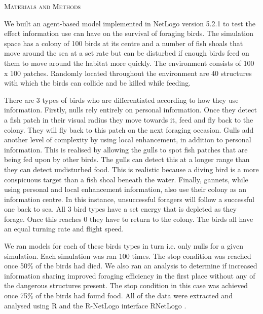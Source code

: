 \documentclass[12pt,letterpaper]{article}
\renewcommand{\section}[1]{%
\bigskip
\begin{center}
\begin{Large}
\normalfont\scshape #1
\medskip
\end{Large}
\end{center}}
\begin{document}
%
%
\section{Materials and Methods}
We built an agent-based model implemented in NetLogo version 5.2.1 \cite{tisue2004netlogo} to test the effect information use can have on the survival of foraging birds. The simulation space has a colony of 100 birds at its centre and a number of fish shoals that move around the sea at a set rate but can be disturbed if enough birds feed on them to move around the habitat more quickly. The environment consists of 100 x 100 patches. Randomly located throughout the environment are 40 structures with which the birds can collide and be killed while feeding. 

There are 3 types of birds who are differentiated according to how they use information. Firstly, nulls rely entirely on personal information. Once they detect a fish patch in their visual radius they move towards it, feed and fly back to the colony. They will fly back to this patch on the next foraging occasion. Gulls add another level of complexity by using local enhancement, in addition to personal information. This is realised by allowing the gulls to spot fish patches that are being fed upon by other birds. The gulls can detect this at a longer range than they can detect undisturbed food. This is realistic because a diving bird is a more conspicuous target than a fish shoal beneath the water. Finally, gannets, while using personal and local enhancement information, also use their colony as an information centre. In this instance, unsuccessful foragers will follow a successful one back to sea. All 3 bird types have a set energy that is depleted as they forage. Once this reaches 0 they have to return to the colony. The birds all have an equal turning rate and flight speed. 

We ran models for each of these birds types in turn i.e. only nulls for a given simulation. Each simulation was ran 100 times. The stop condition was reached once 50\% of the birds had died. We also ran an analysis to determine if increased information sharing improved foraging efficiency in the first place without any of the dangerous structures present. The stop condition in this case was achieved once 75\% of the birds had found food. All of the data were extracted and analysed using R \cite{RCran} and the R-NetLogo interface RNetLogo \cite{thiele2014r}.  
%
%
\end{document}

